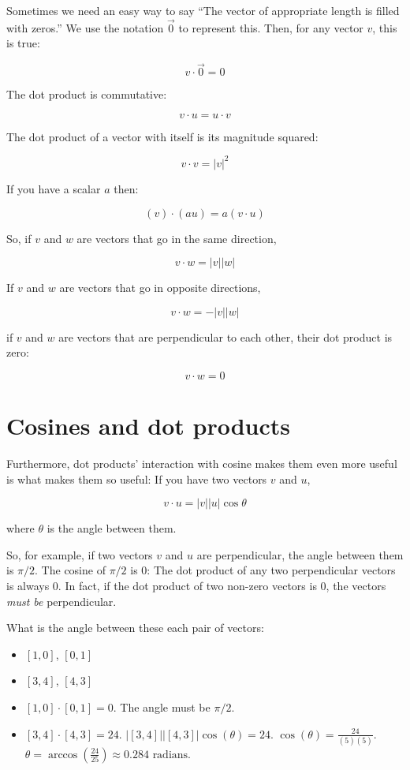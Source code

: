 Sometimes we need an easy way to say ``The vector of appropriate length is filled with zeros.''
We use the notation $\vec{0}$ to represent this. Then, for any vector $v$, this is true:

$$v \cdot \vec{0} = 0$$

The dot product is commutative:

$$v \cdot u = u \cdot v$$

The dot product of a vector with itself is its magnitude squared:

$$ v \cdot v = |v|^2 $$

If you have a scalar $a$ then:

    $$(v) \cdot (a u) = a (v \cdot u)$$

So, if $v$ and $w$ are vectors that go in the same direction,

    $$v \cdot w = |v| |w|$$

If $v$ and $w$ are vectors that go in opposite directions,

    $$v \cdot w = -|v| |w|$$
    
if $v$ and $w$ are vectors that are perpendicular to each other, their dot product is zero:

  $$ v \cdot w = 0 $$

\section{Cosines and dot products}

Furthermore, dot products' interaction with cosine makes them even more useful is what makes them so useful: 
If you have two vectors $v$ and $u$,

$$v \cdot u = |v| |u| \cos \theta$$

where $\theta$ is the angle between them.

So, for example, if two vectors $v$ and $u$ are perpendicular, the angle between them is $\pi/2$.  
The cosine of $\pi/2$ is 0: The dot product of any two perpendicular vectors is always 0. In fact, if 
the dot product of two non-zero vectors is 0, the vectors \textit{must be} perpendicular.

\begin{Exercise}[title={Using dot products}, label=cos_dot_products]
    What is the angle between these each pair of vectors:
    \begin{itemize}
        \item $[1, 0]$, $[0, 1]$
        \item $[3,4]$, $[4,3]$
    \end{itemize}
\end{Exercise}
\begin{Answer}[ref=cos_dot_products]
        \begin{itemize}
            \item $[1,0] \cdot [0,1] = 0$.  The angle must be $\pi/2$.
            \item $[3,4] \cdot [4, 3] = 24$. $|[3,4]| |[4,3]| \cos(\theta) = 24$. 
            $\cos(\theta) = \frac{24}{(5)(5)}$. $\theta = \arccos(\frac{24}{25}) \approx 0.284 \text{ radians}$.
        \end{itemize}
\end{Answer}

